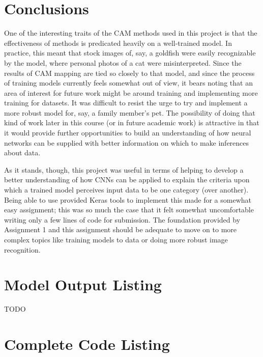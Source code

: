 \documentclass{article}
\begin{document}
\section{Conclusions}
One of the interesting traits of the CAM methods used in this project is that the effectiveness of methods is predicated heavily on a well-trained model.
In practice, this meant that stock images of, say, a goldfish were easily recognizable by the model, where personal photos of a cat were misinterpreted.
Since the results of CAM mapping are tied so closely to that model, and since the process of training models currently feels somewhat out of view, it bears noting that an area of interest for future work might be around training and implementing more training for datasets. It was difficult to resist the urge to try and implement a more robust model for, say, a family member's pet. 
The possibility of doing that kind of work later in this course (or in future academic work) is attractive in that it would provide further opportunities to build an understanding of how neural networks can be supplied with better information on which to make inferences about data.

\par As it stands, though, this project was useful in terms of helping to develop a better understanding of how CNNs can be applied to explain the criteria upon which a trained model perceives input data to be one category (over another).
Being able to use provided Keras tools to implement this made for a somewhat easy assignment; this was so much the case that it felt somewhat uncomfortable writing only a few lines of code for submission.
The foundation provided by Assignment 1 and this assignment should be adequate to move on to more complex topics like training models to data or doing more robust image recognition.

\begin{appendices}

\newpage
\section{Model Output Listing} \label{modelouts}
TODO
\newpage
\section{Complete Code Listing} \label{codelist}

\end{appendices}



\end{document}
